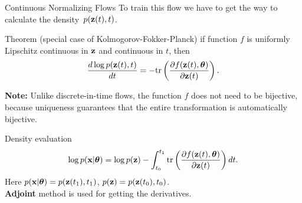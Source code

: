 \begin{frame}{Continuous Normalizing Flows}
	To train this flow we have to get the way to calculate the density~$p(\mathbf{z}(t), t)$.
	\begin{block}{Theorem (special case of Kolmogorov-Fokker-Planck)}
		if function $f$ is uniformly Lipschitz continuous in $\mathbf{z}$ and continuous in $t$, then
		\[
			\frac{d \log p(\mathbf{z}(t), t)}{d t} = - \text{tr} \left( \frac{\partial f (\mathbf{z}(t), \boldsymbol{\theta})}{\partial \mathbf{z}(t)} \right).
		\]
		\vspace{-0.5cm}
	\end{block}
	\textbf{Note:} Unlike discrete-in-time flows, the function $f$ does not need to be bijective, because uniqueness guarantees that the entire transformation is automatically bijective.
	\begin{block}{Density evaluation}
		\vspace{-0.4cm}
		\[
			\log p(\mathbf{x} | \boldsymbol{\theta}) = \log p(\mathbf{z}) - \int_{t_0}^{t_1} \text{tr}  \left( \frac{\partial f (\mathbf{z}(t), \boldsymbol{\theta})}{\partial \mathbf{z}(t)} \right) dt.
		\]
		Here $p(\mathbf{x} | \boldsymbol{\theta}) = p(\mathbf{z}(t_1), t_1)$, $p(\mathbf{z}) = p(\mathbf{z}(t_0), t_0)$. \\
		\textbf{Adjoint} method is used for getting the derivatives.
	\end{block}
\end{frame}
